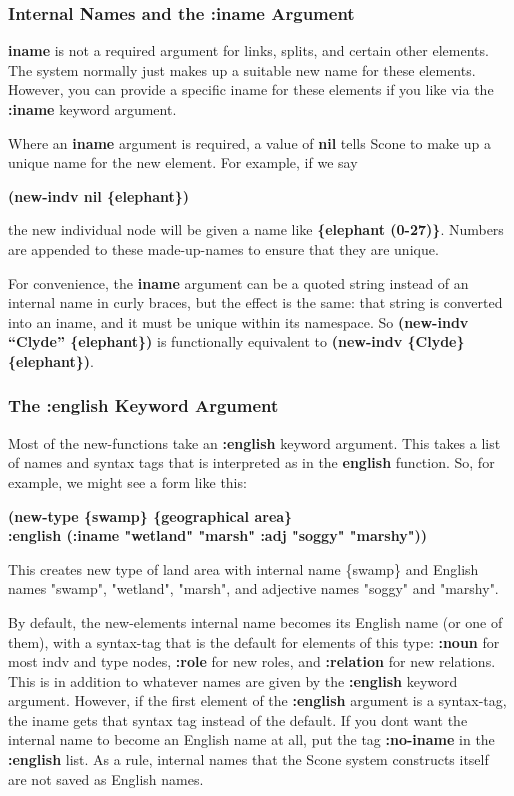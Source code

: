 \documentclass[titlepage,twoside,openright,11pt]{article}
\begin{document}
\subsubsection{\texorpdfstring{\textbf{Internal Names and the :iname
Argument}}{Internal Names and the :iname Argument}}\label{internal-names-and-the-iname-argument}

\textbf{iname} is not a required argument for links, splits, and certain
other elements. The system normally just makes up a suitable new name
for these elements. However, you can provide a specific iname for these
elements if you like via the \textbf{:iname} keyword argument.

Where an \textbf{iname} argument is required, a value of \textbf{nil}
tells Scone to make up a unique name for the new element. For example,
if we say

\textbf{(new-indv nil \{elephant\})}

the new individual node will be given a name like \textbf{\{elephant
(0-27)\}}. Numbers are appended to these made-up-names to ensure that
they are unique.

For convenience, the \textbf{iname} argument can be a quoted string
instead of an internal name in curly braces, but the effect is the same:
that string is converted into an iname, and it must be unique within its
namespace. So \textbf{(new-indv ``Clyde'' \{elephant\})} is functionally
equivalent to \textbf{(new-indv \{Clyde\} \{elephant\})}.

\subsubsection{The :english Keyword
Argument}\label{the-english-keyword-argument}

Most of the new-functions take an \textbf{:english} keyword argument.
This takes a list of names and syntax tags that is interpreted as in the
\textbf{english} function. So, for example, we might see a form like
this:

\textbf{(new-type \{swamp\} \{geographical area\}\\
:english \textquotesingle(:iname "wetland" "marsh" :adj "soggy"
"marshy"))}

This creates new type of land area with internal name \{swamp\} and
English names "swamp", "wetland", "marsh", and adjective names "soggy"
and "marshy".

By default, the new-element\textquotesingle s internal name becomes its
English name (or one of them), with a syntax-tag that is the default for
elements of this type: \textbf{:noun} for most indv and type nodes,
\textbf{:role} for new roles, and \textbf{:relation} for new relations.
This is in addition to whatever names are given by the \textbf{:english}
keyword argument. However, if the first element of the \textbf{:english}
argument is a syntax-tag, the iname gets that syntax tag instead of the
default. If you don\textquotesingle t want the internal name to become
an English name at all, put the tag \textbf{:no-iname} in the
\textbf{:english} list. As a rule, internal names that the Scone system
constructs itself are not saved as English names.
\end{document}
